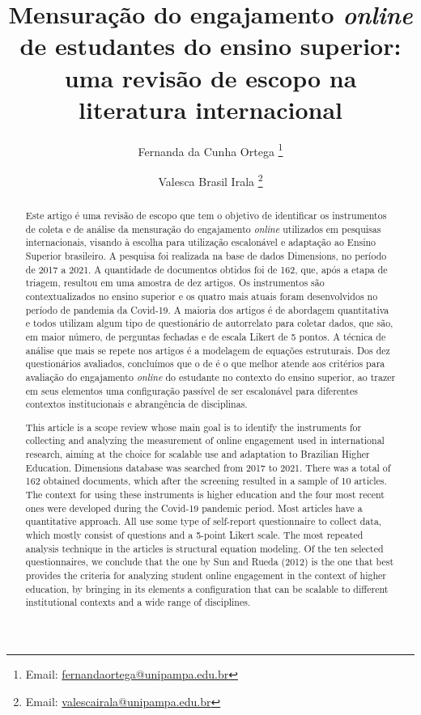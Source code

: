 \documentclass[portuguese]{textolivre}
\title{Mensuração do engajamento \textit{online} de estudantes do ensino superior: uma revisão de escopo na literatura internacional}
\author[1]{Fernanda da Cunha Ortega \orcid{0000-0002-3361-029X} \thanks{Email: \url{fernandaortega@unipampa.edu.br}}}
\author[1]{Valesca Brasil Irala \orcid{0000-0001-6190-8440} \thanks{Email: \url{valescairala@unipampa.edu.br}}}
\affil[1]{Universidade Federal do Pampa, Departamento de Educação, Bagé, RS, Brasil.}
\begin{document}
\maketitle

\begin{polyabstract}
\begin{abstract}
Este artigo é uma revisão de escopo que tem o objetivo de identificar os instrumentos de coleta e de análise da mensuração do engajamento \textit{online} utilizados em pesquisas internacionais, visando à escolha para utilização escalonável e adaptação ao Ensino Superior brasileiro. A pesquisa foi realizada na base de dados Dimensions, no período de 2017 a 2021. A quantidade de documentos obtidos foi de 162, que, após a etapa de triagem, resultou em uma amostra de dez artigos. Os instrumentos são contextualizados no ensino superior e os quatro mais atuais foram desenvolvidos no período de pandemia da Covid-19. A maioria dos artigos é de abordagem quantitativa e todos utilizam algum tipo de questionário de autorrelato para coletar dados, que são, em maior número, de perguntas fechadas e de escala Likert de 5 pontos. A técnica de análise que mais se repete nos artigos é a modelagem de equações estruturais. Dos dez questionários avaliados, concluímos que o de \textcite{sun2012} é o que melhor atende aos critérios para avaliação do engajamento \textit{online} do estudante no contexto do ensino superior, ao trazer em seus elementos uma configuração passível de ser escalonável para diferentes contextos institucionais e abrangência de disciplinas.

\end{abstract}

\begin{english}
\begin{abstract}
This article is a scope review  whose main goal is to identify the instruments for collecting and analyzing the measurement of online engagement used in international research,  aiming at the choice for scalable use and adaptation to Brazilian Higher Education. Dimensions database was searched from 2017 to 2021.  There was a total of 162 obtained documents, which after the screening resulted in a sample of 10 articles. The context for using these instruments is higher education and the four most recent ones were developed during the Covid-19 pandemic period. Most articles have a quantitative approach. All use some type of self-report questionnaire to collect data, which mostly consist of questions and a 5-point Likert scale.  The most repeated analysis technique in the articles is structural equation modeling. Of the ten selected questionnaires, we conclude that the one by Sun and Rueda (2012) is the one that best provides the criteria for analyzing student online engagement in the context of higher education, by bringing in its elements a configuration that can be scalable to different institutional contexts and  a wide range of disciplines.


\end{abstract}
\end{english}
\end{polyabstract}
\end{document}
